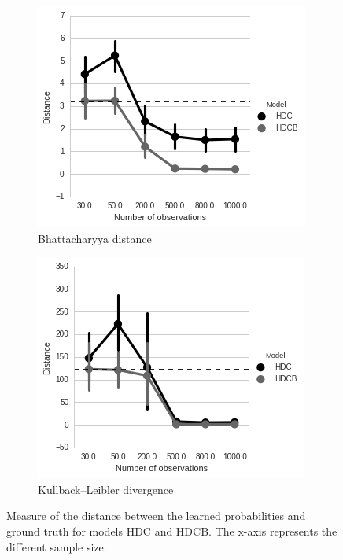 \begin{figure}[htp]
\centering

\begin{subfigure}{.45\textwidth}
  \centering
  \includegraphics[width=\linewidth]{images/HDCB-Bhattacharya-Distance.png}
    \caption{Bhattacharyya distance}
\end{subfigure}
\begin{subfigure}{.45\textwidth}
  \centering
  \includegraphics[width=\linewidth]{images/HDCB-KL-Distance.png}
    \caption{Kullback–Leibler divergence}
\end{subfigure}

\caption[Model evaluation]{Measure of the distance between the learned probabilities and ground truth for models HDC and HDCB. The x-axis represents the different sample size.}
\label{fig:B-KL-evaluation}
\end{figure}

